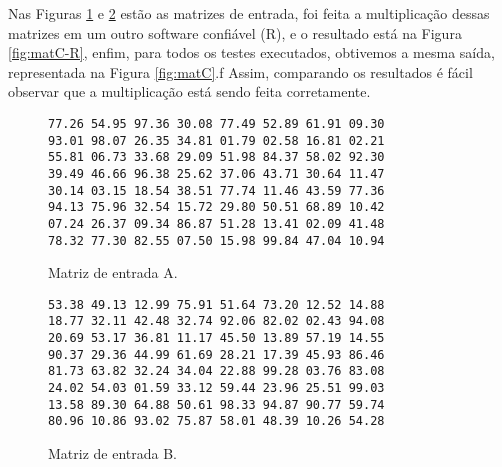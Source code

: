 \documentclass[conference]{IEEEtran}
\begin{document}
\begin{table}[htb!]
Nas Figuras \ref{fig:matA} e \ref{fig:matB} estão as matrizes de entrada, foi feita a multiplicação dessas matrizes em um outro software confiável (R), e o resultado está na Figura \ref{fig:matC-R}, enfim, para todos os testes executados, obtivemos a mesma saída, representada na Figura \ref{fig:matC}.f Assim, comparando os resultados é fácil observar que a multiplicação está sendo feita corretamente.

\begin{figure}[htb!]
\begin{adjustbox}{max width=\linewidth}
	\begin{BVerbatim}
77.26 54.95 97.36 30.08 77.49 52.89 61.91 09.30
93.01 98.07 26.35 34.81 01.79 02.58 16.81 02.21
55.81 06.73 33.68 29.09 51.98 84.37 58.02 92.30
39.49 46.66 96.38 25.62 37.06 43.71 30.64 11.47
30.14 03.15 18.54 38.51 77.74 11.46 43.59 77.36
94.13 75.96 32.54 15.72 29.80 50.51 68.89 10.42
07.24 26.37 09.34 86.87 51.28 13.41 02.09 41.48
78.32 77.30 82.55 07.50 15.98 99.84 47.04 10.94
	\end{BVerbatim}
\end{adjustbox}
\caption{Matriz de entrada A.\label{fig:matA}}
\end{figure}


\begin{figure}[htb!]
	\begin{adjustbox}{max width=\linewidth}
		\begin{BVerbatim}
53.38 49.13 12.99 75.91 51.64 73.20 12.52 14.88
18.77 32.11 42.48 32.74 92.06 82.02 02.43 94.08
20.69 53.17 36.81 11.17 45.50 13.89 57.19 14.55
90.37 29.36 44.99 61.69 28.21 17.39 45.93 86.46
81.73 63.82 32.24 34.04 22.88 99.28 03.76 83.08
24.02 54.03 01.59 33.12 59.44 23.96 25.51 99.03
13.58 89.30 64.88 50.61 98.33 94.87 90.77 59.74
80.96 10.86 93.02 75.87 58.01 48.39 10.26 54.28
		\end{BVerbatim}
	\end{adjustbox}
	\caption{Matriz de entrada B.\label{fig:matB}}
\end{figure}


\end{table}
\end{document}
